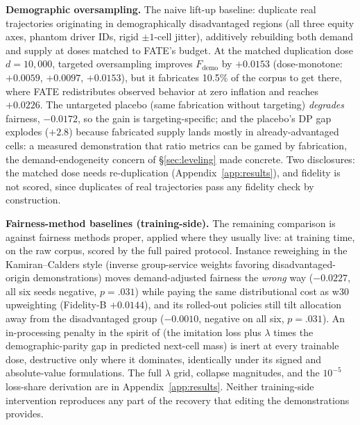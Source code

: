 \textbf{Demographic oversampling.} The naive lift-up baseline: duplicate
real trajectories originating in demographically disadvantaged regions
\cite{kamirancalders2012,zietlow2022} (all
three equity axes, phantom driver IDs, rigid $\pm 1$-cell jitter), additively
rebuilding both demand and supply at doses matched to FATE's budget. At
the matched duplication dose $d = 10{,}000$, targeted oversampling improves
$F_{\mathrm{demo}}$ by $+0.0153$ (dose-monotone:
$+0.0059$, $+0.0097$, $+0.0153$), but it fabricates 10.5\% of the corpus
to get there, where FATE redistributes observed behavior at zero inflation
and reaches $+0.0226$. The untargeted placebo (same fabrication without targeting)
\emph{degrades} fairness, $-0.0172$, so the gain is targeting-specific; and
the placebo's DP gap explodes ($+2.8$) because fabricated supply lands
mostly in already-advantaged cells: a measured demonstration that
ratio metrics can be gamed by fabrication, the demand-endo\-ge\-ne\-ity concern of
\S\ref{sec:leveling} made concrete. Two disclosures: the matched dose needs
re-duplication (Appendix~\ref{app:results}), and fidelity is not
scored, since duplicates of real trajectories pass any fidelity check by
construction.

\textbf{Fairness-method baselines (training-side).} The remaining comparison
is against fairness methods proper, applied where they usually live: at
training time, on the raw corpus, scored by the full paired protocol.
Instance reweighing in the Kamiran--Calders style
\cite{kamirancalders2012} (inverse group-service weights favoring
disadvantaged-origin demonstrations) moves demand-adjusted fairness the
\emph{wrong} way ($-0.0227$, all six seeds negative, $p = .031$) while
paying the same distributional cost as w30 upweighting (Fidelity-B
$+0.0144$), and its rolled-out policies still tilt allocation away from the %
disadvantaged group ($-0.0010$, negative on all six, $p = .031$). An
in-processing penalty
in the spirit of \cite{zheng2023} (the imitation loss plus $\lambda$
times the demo\-graph\-ic-parity gap in predicted next-cell mass) is inert at
every trainable dose, destructive only where it dominates, identically
under its signed and absolute-value formulations. The full $\lambda$ grid,
collapse magnitudes, and the $10^{-5}$ loss-share derivation are in
Appendix~\ref{app:results}.
Neither training-side intervention reproduces any part of the recovery
that editing the demonstrations provides.

